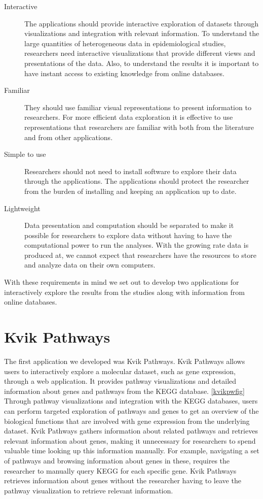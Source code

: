 \begin{description} 
\item[Interactive] The applications should provide interactive exploration
    of datasets through visualizations and integration with relevant
    information. 
    To understand the large quantities of heterogeneous data in
    epidemiological studies, researchers need interactive visualizations
    that provide different views and presentations of the data. Also, to
    understand the results it is important to have instant access to
    existing knowledge from online databases. 
    
\item[Familiar] They should use familiar visual representations to present
    information to researchers. For more efficient data exploration it is 
    effective to use representations that researchers are familiar with both from
    the literature and from other applications. 
    
\item[Simple to use] Researchers should not need to install software to
    explore their data through the applications. The applications should 
    protect the researcher from the burden of installing and keeping an
    application up to date. 
    
\item[Lightweight] Data presentation and computation should be separated
    to make it possible for researchers to explore data without having to
    have the computational power to run the analyses. With the growing rate
    data is produced at, we cannot expect that researchers have the resources to
    store and analyze data on their own computers. 
    
\end{description}

With these requirements in mind we set out to develop two applications for
interactively explore the results from the studies along with information
from online databases. 

\section{Kvik Pathways}
The first application we developed was Kvik Pathways. Kvik Pathways allows users
to interactively explore a molecular dataset, such as gene expression, through a
web application. It provides pathway visualizations and detailed information
about genes and pathways from the KEGG database. \ref{kvikpwfig} Through pathway
visualizations and integration with the KEGG databases, users can perform
targeted exploration of pathways and genes to get an overview of the biological
functions that are involved with gene expression from the underlying dataset.
Kvik Pathways gathers information about related pathways and retrieves relevant
information about genes, making it unnecessary for researchers to spend valuable
time looking up this information manually. For example, navigating a set of
pathways and browsing information about genes in these, requires the researcher
to manually query KEGG for each specific gene.  Kvik Pathways retrieves
information about genes without the researcher having to leave the pathway
visualization to retrieve relevant information.

